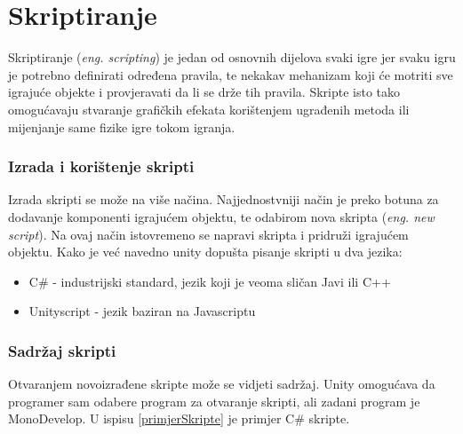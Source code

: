 \section{Skriptiranje}
Skriptiranje (\emph{eng. scripting}) je jedan od osnovnih dijelova svaki igre jer svaku igru je potrebno definirati određena pravila, te nekakav mehanizam koji će motriti sve igrajuće objekte i provjeravati da li se drže tih pravila. Skripte isto tako omogućavaju stvaranje grafičkih efekata korištenjem ugrađenih metoda ili mijenjanje same fizike igre tokom igranja.
\subsubsection{Izrada i korištenje skripti}
Izrada skripti se može na više načina. Najjednostvniji način je preko botuna za dodavanje komponenti igrajućem objektu, te odabirom nova skripta (\emph{eng. new script}). Na ovaj način istovremeno se napravi skripta i pridruži igrajućem objektu. Kako je već navedno unity dopušta pisanje skripti u dva jezika:
\begin{itemize} 
	\item C\# - industrijski standard, jezik koji je veoma sličan Javi ili C++
	\item Unityscript - jezik baziran na Javascriptu
\end{itemize}
\subsubsection{Sadržaj skripti}
Otvaranjem novoizrađene skripte može se vidjeti sadržaj. Unity omogućava da programer sam odabere program za otvaranje skripti, ali zadani program je MonoDevelop. U ispisu \ref{primjerSkripte}  je primjer C\# skripte.

